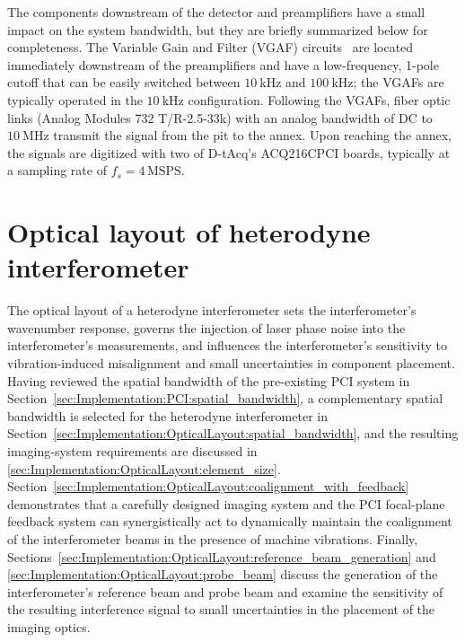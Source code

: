 The components downstream of the detector and preamplifiers
have a small impact on the system bandwidth, but
they are briefly summarized below for completeness.
The Variable Gain and Filter (VGAF) circuits~\cite[Sec.~3.3.3]{dorris_phd}
are located immediately downstream of the preamplifiers and
have a low-frequency, 1-pole cutoff that can be easily switched between
$\SI{10}{\kilo\hertz}$ and $\SI{100}{\kilo\hertz}$;
the VGAFs are typically operated in the $\SI{10}{\kilo\hertz}$ configuration.
Following the VGAFs,
fiber optic links (Analog Modules 732 T/R-2.5-33k)
with an analog bandwidth of DC to $\SI{10}{\mega\hertz}$
transmit the signal from the \diiid \space pit to the annex.
Upon reaching the annex,
the signals are digitized with two of D-tAcq's ACQ216CPCI boards,
typically at a sampling rate of $f_s = 4 \, \text{MSPS}$.


\section{Optical layout of heterodyne interferometer}
\label{sec:Implementation:OpticalLayout}
The optical layout of a heterodyne interferometer
sets the interferometer's wavenumber response,
governs the injection of laser phase noise
into the interferometer's measurements, and
influences the interferometer's sensitivity
to vibration-induced misalignment and
small uncertainties in component placement.
Having reviewed the spatial bandwidth
of the pre-existing PCI system in
Section~\ref{sec:Implementation:PCI:spatial_bandwidth},
a complementary spatial bandwidth is selected
for the heterodyne interferometer in
Section~\ref{sec:Implementation:OpticalLayout:spatial_bandwidth}, and
the resulting imaging-system requirements are discussed
in \ref{sec:Implementation:OpticalLayout:element_size}.
Section~\ref{sec:Implementation:OpticalLayout:coalignment_with_feedback}
demonstrates that a carefully designed imaging system and
the PCI focal-plane feedback system can synergistically act
to dynamically maintain the coalignment of the interferometer beams
in the presence of machine vibrations.
Finally,
Sections~\ref{sec:Implementation:OpticalLayout:reference_beam_generation}
and \ref{sec:Implementation:OpticalLayout:probe_beam}
discuss the generation
of the interferometer's reference beam and probe beam and
examine the sensitivity
of the resulting interference signal to small uncertainties
in the placement of the imaging optics.


